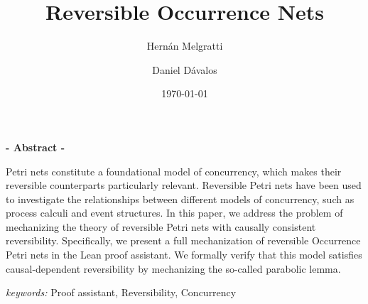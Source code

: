 \documentclass{report}
\title{Reversible Occurrence Nets}
\author{Hernán Melgratti \and Daniel Dávalos}
\affil{Universidad de Buenos Aires}
\date{\today}
\begin{document}
\maketitle

\begin{center}
  \textbf{- Abstract -}
\end{center}

Petri nets constitute a foundational model of concurrency, which makes their reversible counterparts particularly relevant. Reversible
Petri nets have been used to investigate the relationships between different models of concurrency, such as process calculi and event structures.
In this paper, we address the problem of mechanizing the theory of reversible Petri nets with causally consistent reversibility. Specifically, we
present a full mechanization of reversible Occurrence Petri nets in the
Lean proof assistant. We formally verify that this model satisfies causal-dependent reversibility by mechanizing the so-called parabolic lemma.

\emph{keywords:} Proof assistant, Reversibility, Concurrency


\end{document}
